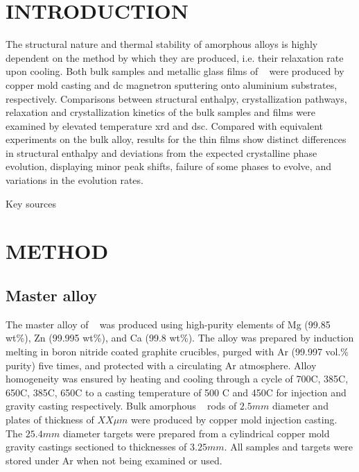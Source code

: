 \documentclass[draft,a4paper,12pt,oneside]{article}%
\begin{document}
\newpage
\tableofcontents\newpage
{}
\clearpage %


\section{INTRODUCTION}
\glsresetall

The structural nature and thermal stability of amorphous alloys is highly dependent on the method by which they are produced, i.e. their relaxation rate upon cooling.  Both bulk samples and metallic glass films of \MgZnCa~ were produced by copper mold casting and \gls{dc} magnetron sputtering onto aluminium substrates, respectively. Comparisons between structural enthalpy, crystallization pathways, relaxation and crystallization kinetics of the bulk samples and films were examined by elevated temperature \acrshort{xrd} and \acrshort{dsc}. Compared with equivalent experiments on the bulk alloy, results for the thin films show distinct differences in structural enthalpy and deviations from the expected crystalline phase evolution, displaying minor peak shifts, failure of some phases to evolve, and variations in the evolution rates. 

Key sources \cite{Zhang2013, Zhang2012} 
\cite{Zhang2011}


\section{METHOD}

\subsection{Master alloy}
The master alloy of \MgZnCa~ was produced using high-purity elements of Mg (99.85 wt\%), Zn (99.995 wt\%), and Ca (99.8 wt\%). The alloy was prepared by induction melting in boron nitride coated graphite crucibles, purged with Ar (99.997 vol.\% purity) five times, and protected with a circulating Ar atmosphere. Alloy homogeneity was ensured by heating and cooling through a cycle of 700\degree C, 385\degree C, 650\degree C, 385\degree C, 650\degree C to a casting temperature of 500 \degree C and 450\degree C for injection and gravity casting respectively. Bulk amorphous \MgZnCa~ rods of $2.5 mm$ diameter and plates of thickness of $XX \mu m$ were produced by copper mold injection casting. The $25.4 mm$ diameter targets were prepared from a cylindrical copper mold gravity castings sectioned to thicknesses of $3.25 mm$. All samples and targets were stored under Ar when not being examined or used. 
\end{document}
